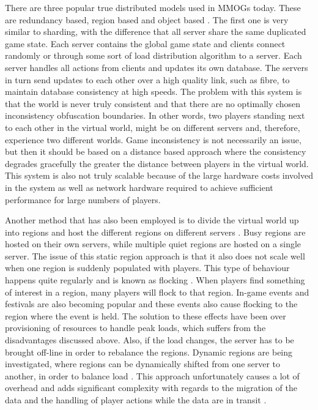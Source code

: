 \documentclass[journal,oneside,a4paper,onecolumn]{IEEEtran}
\begin{document}
There are three popular true distributed models used in MMOGs today. These are redundancy based, region based and object based \cite{}. The first one is very similar to sharding, with the difference that all server share the same duplicated game state. Each server contains the global game state and clients connect randomly or through some sort of load distribution algorithm to a server. Each server handles all actions from clients and updates its own database. The servers in turn send updates to each other over a high quality link, such as fibre, to maintain database consistency at high speeds. The problem with this system is that the world is never truly consistent and that there are no optimally chosen inconsistency obfuscation boundaries. In other words, two players standing next to each other in the virtual world, might be on different servers and, therefore, experience two different worlds. Game inconsistency is not necessarily an issue, but then it should be based on a distance based approach where the consistency degrades gracefully the greater the distance between players in the virtual world. This system is also not truly scalable because of the large hardware costs involved in the system as well as network hardware required to achieve sufficient performance for large numbers of players.

Another method that has also been employed is to divide the virtual world up into regions and host the different regions on different servers \cite{}. Busy regions are hosted on their own servers, while multiple quiet regions are hosted on a single server. The issue of this static region approach is that it also does not scale well when one region is suddenly populated with players. This type of behaviour happens quite regularly and is known as flocking \cite{}. When players find something of interest in a region, many players will flock to that region. In-game events and festivals are also becoming popular and these events also cause flocking to the region where the event is held. The solution to these effects have been over provisioning of resources to handle peak loads, which suffers from the disadvantages discussed above. Also, if the load changes, the server has to be brought off-line in order to rebalance the regions. Dynamic regions are being investigated, where regions can be dynamically shifted from one server to another, in order to balance load \cite{}. This approach unfortunately causes a lot of overhead and adds significant complexity with regards to the migration of the data and the handling of player actions while the data are in transit \cite{}.
\end{document}
